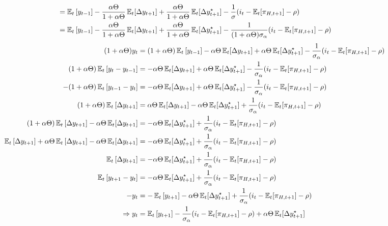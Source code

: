 \documentclass[12pt]{article}
\begin{document}
\begin{landscape}
\begin{align*}
    &= \operatorname{\mathbb{E}}_t\left[y_{t-1}\right] - \frac{\alpha \Theta}{1+\alpha \Theta} \operatorname{\mathbb{E}}_t[\Delta y_{t+1}] + \frac{\alpha \Theta}{1+\alpha \Theta}\operatorname{\mathbb{E}}_t[\Delta y_{t+1}^{\star}] - \frac{1}{\sigma}( i_t  - \operatorname{\mathbb{E}}_t [\pi_{H,t+1}] - \rho  ) \\
    &= \operatorname{\mathbb{E}}_t\left[y_{t-1}\right] - \frac{\alpha \Theta}{1+\alpha \Theta} \operatorname{\mathbb{E}}_t[\Delta y_{t+1}] + \frac{\alpha \Theta}{1+\alpha \Theta}\operatorname{\mathbb{E}}_t[\Delta y_{t+1}^{\star}] - \frac{1}{(1+\alpha \Theta)\sigma_\alpha}( i_t  - \operatorname{\mathbb{E}}_t [\pi_{H,t+1}] - \rho  ) \\
\end{align*}  
\begin{align}  
    (1+\alpha \Theta)y_t&= (1+\alpha \Theta)\operatorname{\mathbb{E}}_t\left[y_{t-1}\right] - \alpha \Theta \operatorname{\mathbb{E}}_t[\Delta y_{t+1}] + \alpha \Theta\operatorname{\mathbb{E}}_t[\Delta y_{t+1}^{\star}] - \frac{1}{\sigma_\alpha}( i_t  - \operatorname{\mathbb{E}}_t [\pi_{H,t+1}] - \rho  ) \nonumber\\
    (1+\alpha \Theta)\operatorname{\mathbb{E}}_t\left[y_t - y_{t-1}\right]&=  - \alpha \Theta \operatorname{\mathbb{E}}_t[\Delta y_{t+1}] + \alpha \Theta\operatorname{\mathbb{E}}_t[\Delta y_{t+1}^{\star}] - \frac{1}{\sigma_\alpha}( i_t  - \operatorname{\mathbb{E}}_t [\pi_{H,t+1}] - \rho  ) \nonumber\\
    -(1+\alpha \Theta)\operatorname{\mathbb{E}}_t\left[y_{t-1} - y_t \right]&=  - \alpha \Theta \operatorname{\mathbb{E}}_t[\Delta y_{t+1}] + \alpha \Theta\operatorname{\mathbb{E}}_t[\Delta y_{t+1}^{\star}] - \frac{1}{\sigma_\alpha}( i_t  - \operatorname{\mathbb{E}}_t [\pi_{H,t+1}] - \rho  ) \nonumber\\
    (1+\alpha \Theta)\operatorname{\mathbb{E}}_t\left[\Delta y_{t+1}\right]&=  \alpha \Theta \operatorname{\mathbb{E}}_t[\Delta y_{t+1}] - \alpha \Theta\operatorname{\mathbb{E}}_t[\Delta y_{t+1}^{\star}] + \frac{1}{\sigma_\alpha}( i_t  - \operatorname{\mathbb{E}}_t [\pi_{H,t+1}] - \rho  ) \nonumber\\
    (1+\alpha \Theta)\operatorname{\mathbb{E}}_t\left[\Delta y_{t+1}\right] - \alpha \Theta \operatorname{\mathbb{E}}_t[\Delta y_{t+1}]&= - \alpha \Theta\operatorname{\mathbb{E}}_t[\Delta y_{t+1}^{\star}] + \frac{1}{\sigma_\alpha}( i_t  - \operatorname{\mathbb{E}}_t [\pi_{H,t+1}] - \rho  ) \nonumber\\
    \operatorname{\mathbb{E}}_t\left[\Delta y_{t+1}\right] +\alpha \Theta\operatorname{\mathbb{E}}_t\left[\Delta y_{t+1}\right] - \alpha \Theta \operatorname{\mathbb{E}}_t[\Delta y_{t+1}]&= - \alpha \Theta\operatorname{\mathbb{E}}_t[\Delta y_{t+1}^{\star}] + \frac{1}{\sigma_\alpha}( i_t  - \operatorname{\mathbb{E}}_t [\pi_{H,t+1}] - \rho  ) \nonumber\\
    \operatorname{\mathbb{E}}_t\left[\Delta y_{t+1}\right] &= - \alpha \Theta\operatorname{\mathbb{E}}_t[\Delta y_{t+1}^{\star}] + \frac{1}{\sigma_\alpha}( i_t  - \operatorname{\mathbb{E}}_t [\pi_{H,t+1}] - \rho  ) \nonumber\\
    \operatorname{\mathbb{E}}_t\left[y_{t+1}-y_t\right] &= - \alpha \Theta\operatorname{\mathbb{E}}_t[\Delta y_{t+1}^{\star}] + \frac{1}{\sigma_\alpha}( i_t  - \operatorname{\mathbb{E}}_t [\pi_{H,t+1}] - \rho  )\nonumber\\
    -y_t &= -\operatorname{\mathbb{E}}_t\left[y_{t+1}\right]- \alpha \Theta\operatorname{\mathbb{E}}_t[\Delta y_{t+1}^{\star}] + \frac{1}{\sigma_\alpha}( i_t  - \operatorname{\mathbb{E}}_t [\pi_{H,t+1}] - \rho  ) \nonumber\\
    \Rightarrow y_t &= \operatorname{\mathbb{E}}_t\left[y_{t+1}\right]- \frac{1}{\sigma_\alpha}( i_t  - \operatorname{\mathbb{E}}_t [\pi_{H,t+1}] - \rho  ) + \alpha \Theta\operatorname{\mathbb{E}}_t[\Delta y_{t+1}^{\star}] \\
\end{align}
\end{landscape}
\end{document}
